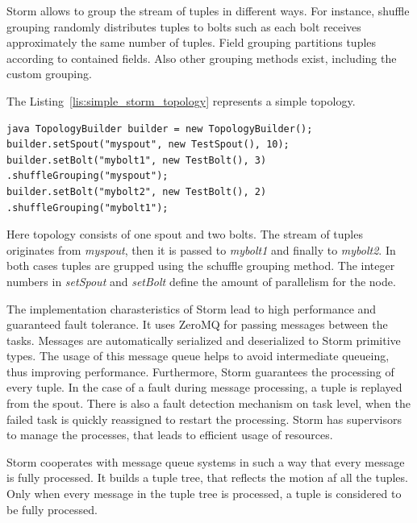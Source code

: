Storm allows to group the stream of tuples in different ways.
For instance, shuffle grouping randomly distributes tuples to bolts such as each bolt receives approximately the same number of tuples.
Field grouping partitions tuples according to contained fields.
Also other grouping methods exist, including the custom grouping.

The Listing~\ref{lis:simple_storm_topology} represents a simple topology.

\begin{lstlisting}[caption=Simple Storm topology, label=lis:simple_storm_topology]
java TopologyBuilder builder = new TopologyBuilder();
builder.setSpout("myspout", new TestSpout(), 10);
builder.setBolt("mybolt1", new TestBolt(), 3) .shuffleGrouping("myspout");
builder.setBolt("mybolt2", new TestBolt(), 2) .shuffleGrouping("mybolt1");
\end{lstlisting}

Here topology consists of one spout and two bolts.
The stream of tuples originates from \textit{myspout}, then it is passed to \textit{mybolt1} and finally to \textit{mybolt2}.
In both cases tuples are grupped using the schuffle grouping method.
The integer numbers in \textit{setSpout} and \textit{setBolt} define the amount of parallelism for the node.

The implementation charasteristics of Storm lead to high performance and guaranteed fault tolerance.
It uses ZeroMQ for passing messages between the tasks.
Messages are automatically serialized and deserialized to Storm primitive types.
The usage of this message queue helps to avoid intermediate queueing, thus improving performance.
Furthermore, Storm guarantees the processing of every tuple.
In the case of a fault during message processing, a tuple is replayed from the spout.
There is also a fault detection mechanism on task level, when the failed task is quickly reassigned to restart the processing.
Storm has supervisors to manage the processes, that leads to efficient usage of resources.

Storm cooperates with message queue systems in such a way that every message is fully processed.
It builds a tuple tree, that reflects the motion af all the tuples.
Only when every message in the tuple tree is processed, a tuple is considered to be fully processed.

